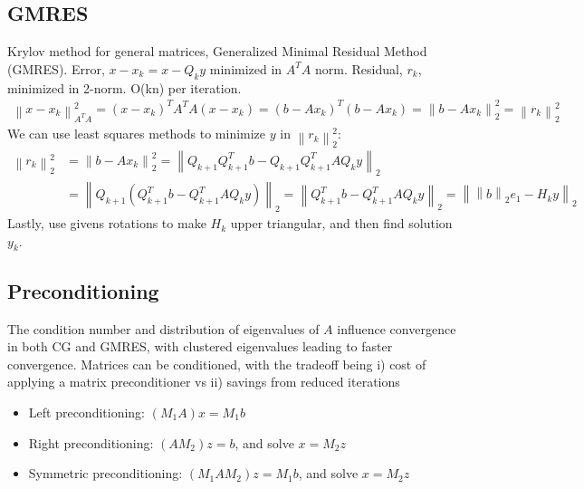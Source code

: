 \documentclass{article}
\newcommand{\norm}[2]{\left\lVert#1\right\rVert_#2}
\begin{document}
\subsection{GMRES}
Krylov method for general matrices, Generalized Minimal Residual Method (GMRES). Error, $x-x_k = x - Q_ky$ minimized in $A^TA$ norm. Residual, $r_k$, minimized in 2-norm. O(kn) per iteration.
\begin{align*}
    \norm{x - x_k}{{A^TA}}^2 = (x - x_k)^TA^TA(x - x_k) = (b - Ax_k)^T(b - Ax_k) = \norm{b - Ax_k}{2}^2 = \norm{r_k}{2}^2
\end{align*}
We can use least squares methods to minimize $y$ in $\norm{r_k}{2}^2$:
\begin{align*}
    \norm{r_k}{2}^2 &= \norm{b - Ax_k}{2}^2 = \norm{Q_{k+1}Q_{k+1}^Tb - Q_{k+1}Q_{k+1}^TAQ_ky}{2}\\
    &=\norm{Q_{k+1}(Q_{k+1}^Tb - Q_{k+1}^TAQ_ky)}{2} =\norm{Q_{k+1}^Tb - Q_{k+1}^TAQ_ky}{2} =\norm{\norm{b}{2}e_1 - H_ky}{2}
\end{align*}
Lastly, use givens rotations to make $H_k$ upper triangular, and then find solution $y_k$.

\subsection{Preconditioning}
The condition number and distribution of eigenvalues of $A$ influence convergence in both CG and GMRES, with clustered eigenvalues leading to faster convergence. Matrices can be conditioned, with the tradeoff being i) cost of applying a matrix preconditioner vs ii) savings from reduced iterations
\begin{itemize}
    \item Left preconditioning: $(M_1A)x = M_1b$
    \item Right preconditioning: $(AM_2)z = b$, and solve $x = M_2z$
    \item Symmetric preconditioning: $(M_1AM_2)z = M_1b$, and solve $x = M_2z$
\end{itemize}
\end{document}
